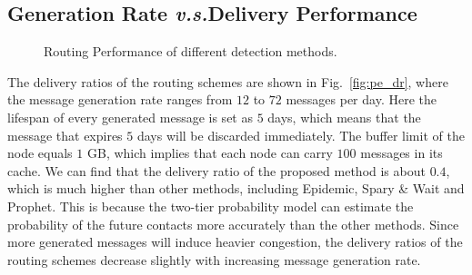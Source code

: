\subsection{Generation Rate {\it v.s.}Delivery Performance}
\begin{figure}
  \centering
  \caption{Routing Performance of different detection methods.}
  \label{fig:pe_routing}
\end{figure}
The delivery ratios of the routing schemes are shown in Fig.~\ref{fig:pe_dr},
where the message generation rate ranges from $12$ to $72$ messages per day.
Here the lifespan of every generated message is set as $5$ days,
which means that the message that expires $5$ days will be discarded immediately.
The buffer limit of the node equals $1$ GB,
which implies that each node can carry $100$ messages in its cache.
We can find that the delivery ratio of the proposed method is about $0.4$,
which is much higher than other methods, including Epidemic, Spary \& Wait and Prophet.
This is because the two-tier probability model can estimate the probability of the future contacts
more accurately than the other methods.
Since more generated messages will induce heavier congestion,
the delivery ratios of the routing schemes decrease slightly with increasing message generation rate.

